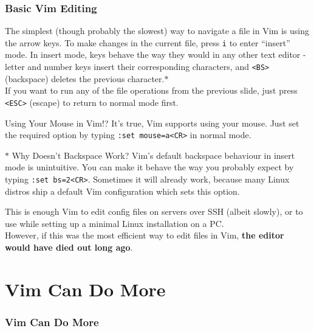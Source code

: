 \documentclass{beamer}
\begin{document}
\begin{frame}[fragile]
    \frametitle{Basic Vim Editing}
    \small
    The simplest (though probably the slowest) way to navigate a file in Vim is using the arrow keys. To make changes in the current file, press \verb+i+ to enter \enquote{insert} mode. In insert mode, keys behave the way they would in any other text editor - letter and number keys insert their corresponding characters, and \verb+<BS>+ (backspace) deletes the previous character.$\ast$ \\
    \vspace{0.5cm}
    If you want to run any of the file operations from the previous slide, just press \verb+<ESC>+ (escape) to return to normal mode first.
    \begin{block}{Using Your Mouse in Vim!?}
	It's true, Vim supports using your mouse. Just set the required option by typing \verb+:set mouse=a<CR>+ in normal mode.
    \end{block}
    \begin{block}{$\ast$ Why Doesn't Backspace Work?}
	Vim's default backspace behaviour in insert mode is unintuitive. You can make it behave the way you probably expect by typing \verb+:set bs=2<CR>+. Sometimes it will already work, because many Linux distros ship a default Vim configuration which sets this option.
    \end{block}
\end{frame}

\begin{frame}[fragile]
    \small This is enough Vim to edit config files on servers over SSH (albeit slowly), or to use while setting up a minimal Linux installation on a PC. \\
    \vspace{0.5cm}
    However, if this was the most efficient way to edit files in Vim, \textbf{the editor would have died out long ago}.
\end{frame}

\section{Vim Can Do More}

\begin{frame}[fragile]
    \frametitle{Vim Can Do More}
    \tableofcontents[currentsection]
\end{frame}
\end{document}
